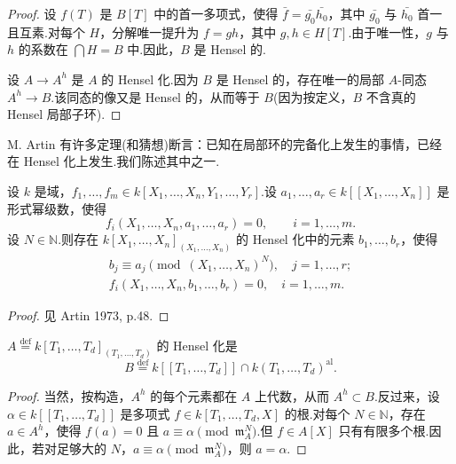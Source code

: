 \begin{proof}
设 $f(T)$ 是 $B[T]$ 中的首一多项式，使得 $\bar{f} = \bar{g_0}\bar{h_0}$，其中 $\bar{g_0}$ 与 $\bar{h_0}$ 首一且互素.对每个 $H$，分解唯一提升为 $f = gh$，其中 $g, h \in H[T]$.由于唯一性，$g$ 与 $h$ 的系数在 $\bigcap H = B$ 中.因此，$B$ 是 Hensel 的.

设 $A \to A^{h}$ 是 $A$ 的 Hensel 化.因为 $B$ 是 Hensel 的，存在唯一的局部 $A$-同态 $A^{h} \to B$.该同态的像又是 Hensel 的，从而等于 $B$(因为按定义，$B$ 不含真的 Hensel 局部子环).
\end{proof}

M. Artin 有许多定理(和猜想)断言：已知在局部环的完备化上发生的事情，已经在 Hensel 化上发生.我们陈述其中之一.

\begin{theorem}\label{thm:4.16}
设 $k$ 是域，$f_1, \ldots, f_m \in k[X_1, \ldots, X_n, Y_1, \ldots, Y_r]$.设 $a_1, \ldots, a_r \in k[[X_1, \ldots, X_n]]$ 是形式幂级数，使得
\[
f_i(X_1, \ldots, X_n, a_1, \ldots, a_r) = 0, \qquad i = 1, \ldots, m.
\]
设 $N \in \mathbb{N}$.则存在 $k[X_1, \ldots, X_n]_{(X_1, \ldots, X_n)}$ 的 Hensel 化中的元素 $b_1, \ldots, b_r$，使得
\[
\begin{array}{l}
b_j \equiv a_j \pmod{(X_1, \ldots, X_n)^{N}}, \quad j = 1, \ldots, r; \\
f_i(X_1, \ldots, X_n, b_1, \ldots, b_r) = 0, \quad i = 1, \ldots, m.
\end{array}
\]
\end{theorem}

\begin{proof}
见 Artin 1973, p.48.
\end{proof}

\begin{corollary}\label{cor:4.17}
$A \overset{\mathrm{def}}{=} k[T_1, \ldots, T_d]_{(T_1, \ldots, T_d)}$ 的 Hensel 化是
\[
B \overset{\mathrm{def}}{=} k[[T_1, \ldots, T_d]] \cap k(T_1, \ldots, T_d)^{\mathrm{al}}.
\]
\end{corollary}

\begin{proof}
当然，按构造，$A^{h}$ 的每个元素都在 $A$ 上代数，从而 $A^{h} \subset B$.反过来，设 $\alpha \in k[[T_1, \ldots, T_d]]$ 是多项式 $f \in k[T_1, \ldots, T_d, X]$ 的根.对每个 $N \in \mathbb{N}$，存在 $a \in A^{h}$，使得 $f(a) = 0$ 且 $a \equiv \alpha \pmod{\mathfrak{m}^{N}_{A}}$.但 $f \in A[X]$ 只有有限多个根.因此，若对足够大的 $N$，$a \equiv \alpha \pmod{\mathfrak{m}^{N}_{A}}$，则 $a = \alpha$.
\end{proof}

